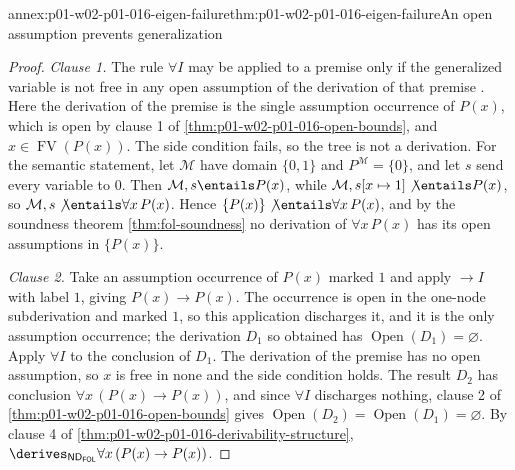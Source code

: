 \begin{annexitem}{annex:p01-w02-p01-016-eigen-failure}{thm:p01-w02-p01-016-eigen-failure}{An open assumption prevents generalization}
\begin{proof}
\emph{Clause 1.} The rule \(\forall I\) may be applied to a premise only if
the generalized variable is not free in any open assumption of the
derivation of that premise \cite[ch.~``First-Order Deduction'', section
``Natural-deduction rules for quantifiers and equality'']{FrozenFormalLogicSemanticData}.
Here the derivation of the premise is the single assumption occurrence of
\(P(x)\), which is open by clause 1 of
\cref{thm:p01-w02-p01-016-open-bounds}, and
\(x\in\operatorname{FV}(P(x))\). The side condition fails, so the tree is not
a derivation. For the semantic statement, let \(\mathcal M\) have domain
\(\{0,1\}\) and \(P^{\mathcal M}=\{0\}\), and let \(s\) send every variable to
\(0\). Then \(\mathcal M,s\entails P(x)\), while
\(\mathcal M,s[x\mapsto1]\not\entails P(x)\), so
\(\mathcal M,s\not\entails\forall x\,P(x)\). Hence
\(\{P(x)\}\not\entails\forall x\,P(x)\), and by the soundness theorem
\cref{thm:fol-soundness} no derivation of \(\forall x\,P(x)\) has its open
assumptions in \(\{P(x)\}\).

\emph{Clause 2.} Take an assumption occurrence of \(P(x)\) marked \(1\) and
apply \(\to I\) with label \(1\), giving \(P(x)\to P(x)\). The occurrence is
open in the one-node subderivation and marked \(1\), so this application
discharges it, and it is the only assumption occurrence; the derivation
\(D_1\) so obtained has \(\operatorname{Open}(D_1)=\varnothing\). Apply
\(\forall I\) to the conclusion of \(D_1\). The derivation of the premise has
no open assumption, so \(x\) is free in none and the side condition holds.
The result \(D_2\) has conclusion \(\forall x\,(P(x)\to P(x))\), and since
\(\forall I\) discharges nothing, clause 2 of
\cref{thm:p01-w02-p01-016-open-bounds} gives
\(\operatorname{Open}(D_2)=\operatorname{Open}(D_1)=\varnothing\). By clause 4
of \cref{thm:p01-w02-p01-016-derivability-structure},
\(\derives_{\mathsf{ND}_{\mathsf{FOL}}}\forall x\,(P(x)\to P(x))\).
\end{proof}
\end{annexitem}
